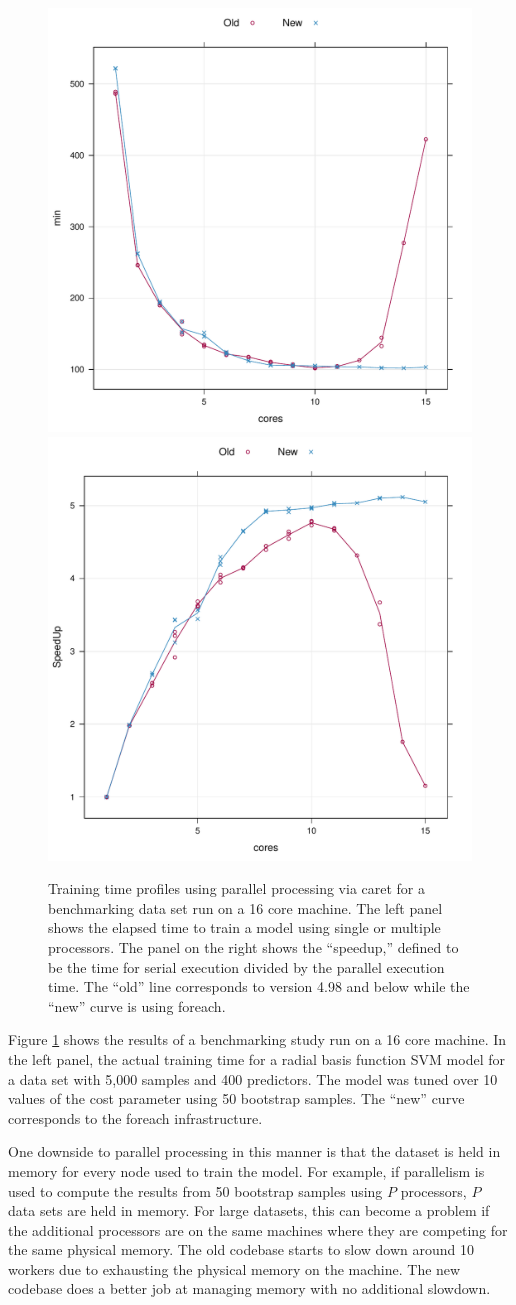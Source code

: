 \documentclass[12pt]{article}
\newcommand{\pkg}[1]{{\fontseries{b}\selectfont #1}}
\renewcommand{\pkg}[1]{{\textsf{#1}}}
\begin{document}
\begin{figure}[t]
  \begin{center}		
    \includegraphics[clip, width = .4\textwidth]{min}    
    \includegraphics[clip, width = .4\textwidth]{speedup}
    \caption{Training time profiles using parallel processing via
      \pkg{caret} for a benchmarking data set run on a 16 core
      machine. The left panel shows the elapsed time to train
      a model using single or multiple
      processors. The panel on the right shows the ``speedup,''
      defined to be the time for serial execution divided by the
      parallel execution time. The ``old'' line corresponds to version
      4.98 and below while the ``new'' curve is using \pkg{foreach}.
    }
    \label{f:parallel}         
  \end{center}
\end{figure}

Figure \ref{f:parallel} shows the results of a benchmarking study run
on a 16 core machine. In the left panel, the actual training time for
a radial basis function SVM model for a data set with 5,000 samples
and 400 predictors. The model was tuned over 10 values of the cost
parameter using 50 bootstrap samples. The ``new'' curve corresponds to
the \pkg{foreach} infrastructure. 

One downside to parallel processing in this manner is that the dataset
is held in memory for every node used to train the model. For example,
if parallelism is used to compute the results from 50 bootstrap
samples using $P$ processors, $P$ data sets are held in memory. For
large datasets, this can become a problem if the additional processors
are on the same machines where they are competing for the same
physical memory. The old codebase starts to slow down around 10
workers due to exhausting the physical memory on the machine. The new
codebase does a better job at managing memory with no additional slowdown.
\end{document}

